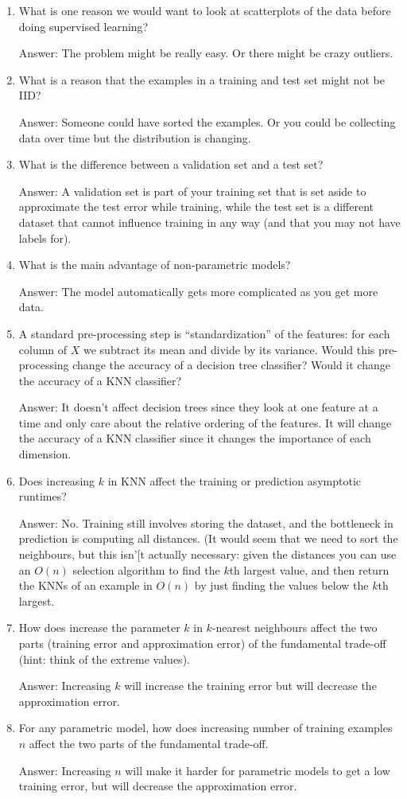 \documentclass{article}
\def\ans#1{\par\gre{Answer: #1}}
\def\gre#1{{\color{gre}#1}}
\def\enum#1{\begin{enumerate}#1\end{enumerate}}
\begin{document}
\enum{
\item What is one reason we would want to look at scatterplots of the data before doing supervised learning?
\ans{The problem might be really easy. Or there might be crazy outliers.}
\item What is a reason that the examples in a training and test set might not be IID?
\ans{Someone could have sorted the examples. Or you could be collecting data over time but the distribution is changing.}
\item What is the difference between a validation set and a test set?
\ans{A validation set is part of your training set that is set aside to approximate the test error while training, while the test set is a different dataset that cannot influence training in any way (and that you may not have labels for).}
\item What is the main advantage of non-parametric models?
\ans{The model automatically gets more complicated as you get more data.}
\item A standard pre-processing step is ``standardization'' of the features: for each column of $X$ we subtract its mean and divide by its variance. Would this pre-processing change the accuracy of a decision tree classifier? Would it change the accuracy of a KNN classifier?
\ans{It doesn't affect decision trees since they look at one feature at a time and only care about the relative ordering of the features. It will change the accuracy of a KNN classifier since it changes the importance of each dimension.}
\item Does increasing $k$ in KNN affect the training or prediction asymptotic runtimes?
\ans{No. Training still involves storing the dataset, and the bottleneck in prediction is computing all distances. (It would seem that we need to sort the neighbours, but this isn'[t actually necessary: given the distances you can use an $O(n)$ selection algorithm to find the $k$th largest value, and then return the KNNs of an example in $O(n)$ by just finding the values below the $k$th largest.}
\item How does increase the parameter $k$ in $k$-nearest neighbours affect the two parts (training error and approximation error) of the fundamental trade-off (hint: think of the extreme values).
\ans{Increasing $k$ will increase the training error but will decrease the approximation error.}
\item For any parametric model, how does increasing number of training examples $n$ affect the two parts of the fundamental trade-off.
\ans{Increasing $n$ will make it harder for parametric models to get a low training error, but will decrease the approximation error.}
}
\end{document}
